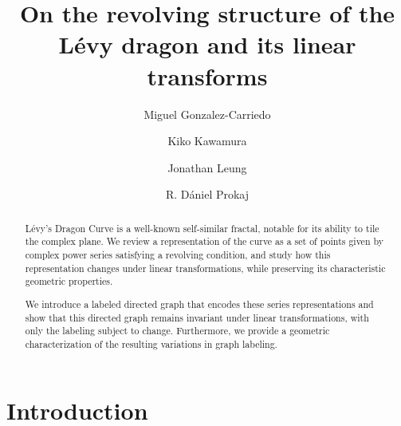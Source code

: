 \documentclass[12pt, a4paper]{amsart}
\numberwithin{equation}{section}
\numberwithin{theorem}{section}
\begin{document}
\title[Revolving structure of the L\'evy dragon]{On the revolving structure of the L\'evy dragon and its linear transforms}

\author[M. Gonzalez-Carriedo]{Miguel Gonzalez-Carriedo}
\address{Miguel Gonzalez-Carriedo, Department of Mathematics, University of North Texas, 1155 Union Circle, Denton, TX 76203-5017, USA}

\author[K. Kawamura]{Kiko Kawamura}
\address{Kiko Kawamura, Department of Mathematics, University of North Texas, 1155 Union Circle, Denton, TX 76203-5017, USA}

\author[J. Leung]{Jonathan Leung}
\address{Jonathan Leung, Department of Mathematics, University of North Texas, 1155 Union Circle, Denton, TX 76203-5017, USA}

\author[R. D. Prokaj]{R. D\'{a}niel Prokaj}
\address{ R. D\'{a}niel Prokaj, Department of Mathematics, University of North Texas, 1155 Union Circle, Denton, TX 76203-5017, USA}


\begin{abstract}
  L\'evy's Dragon Curve is a well-known self-similar fractal, notable for its ability to tile the complex plane. We review a representation of the curve as a set of points given by complex power series satisfying a revolving condition, and study how this representation changes under linear transformations, while preserving its characteristic geometric properties.

  We introduce a labeled directed graph that encodes these series representations and show that this directed graph remains invariant under linear transformations, with only the labeling subject to change. Furthermore, we provide a geometric characterization of the resulting variations in graph labeling.
\end{abstract}




\maketitle
\thispagestyle{empty}

\section{Introduction}
\end{document}
